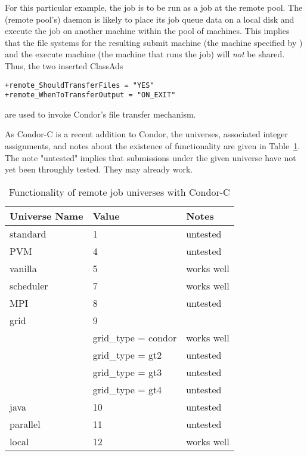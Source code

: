 For this particular example,
the job is to be run as a  
 job at the remote pool.
The (remote pool's)  daemon is likely to
place its job queue data on a local disk 
and execute the job on another machine within the pool of machines.
This implies that the file systems for the resulting submit machine
(the machine specified by ) and
the execute machine (the machine that runs the job) will
\emph{not} be shared.
Thus,
the two inserted ClassAds
\footnotesize
\begin{verbatim}
+remote_ShouldTransferFiles = "YES"
+remote_WhenToTransferOutput = "ON_EXIT"
\end{verbatim}
\normalsize
are used to invoke Condor's file transfer mechanism. 



As Condor-C is a recent addition to Condor,
the universes, associated integer assignments,
and notes about the existence of functionality are given in 
Table~\ref{working-remote-universes}.
The note "untested" implies that
submissions under the given universe have not yet
been throughly tested.
They may already work.

\begin{center}
\begin{table}[hbt]
\begin{tabular}{|l|l|l}
\textbf{Universe Name} & \textbf{Value} & \textbf{Notes}\\ \hline \hline
standard  & 1 & untested \\ \hline
PVM       & 4 & untested \\ \hline
vanilla   & 5 & works well \\ \hline
scheduler & 7 & works well \\ \hline
MPI       & 8 & untested \\ \hline
grid      & 9 & \\
 & grid\_type = condor & works well \\
 & grid\_type = gt2  & untested \\
 & grid\_type = gt3 & untested \\
 & grid\_type = gt4 & untested \\ \hline
java & 10 & untested \\ \hline
parallel & 11 & untested \\ \hline
local & 12 & works well \\ \hline
\end{tabular}
\caption{\label{working-remote-universes}Functionality of remote job universes with Condor-C}
\end{table}
\end{center}

